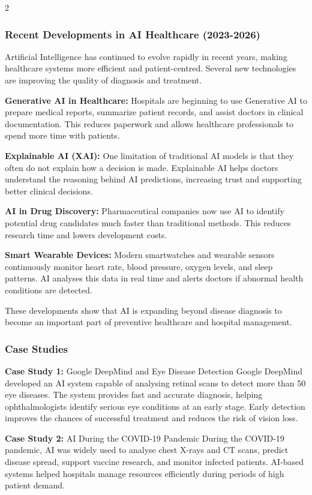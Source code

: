 \begin{multicols}{2}
\subsubsection*{Recent Developments in AI Healthcare (2023-2026)}
Artificial Intelligence has continued to evolve rapidly in recent years, making healthcare systems more efficient and patient-centred. Several new technologies are improving the quality of diagnosis and treatment.

\noindent
\textbf{Generative AI in Healthcare:} Hospitals are beginning to use Generative AI to prepare medical reports, summarize patient records, and assist doctors in clinical documentation. This reduces paperwork and allows healthcare professionals to spend more time with patients.

\noindent
\textbf{Explainable AI (XAI):} One limitation of traditional AI models is that they often do not explain how a decision is made. Explainable AI helps doctors understand the reasoning behind AI predictions, increasing trust and supporting better clinical decisions.

\noindent
\textbf{AI in Drug Discovery:} Pharmaceutical companies now use AI to identify potential drug candidates much faster than traditional methods. This reduces research time and lowers development costs.

\noindent
\textbf{Smart Wearable Devices:}
Modern smartwatches and wearable sensors continuously monitor heart rate, blood pressure, oxygen levels, and sleep patterns. AI analyses this data in real time and alerts doctors if abnormal health conditions are detected.

\noindent
These developments show that AI is expanding beyond disease diagnosis to become an important part of preventive healthcare and hospital management.

\subsubsection*{Case Studies}
\textbf{Case Study 1:} Google DeepMind and Eye Disease Detection
Google DeepMind developed an AI system capable of analysing retinal scans to detect more than 50 eye diseases. The system provides fast and accurate diagnosis, helping ophthalmologists identify serious eye conditions at an early stage. Early detection improves the chances of successful treatment and reduces the risk of vision loss.

\noindent
\textbf{Case Study 2:} AI During the COVID-19 Pandemic
During the COVID-19 pandemic, AI was widely used to analyse chest X-rays and CT scans, predict disease spread, support vaccine research, and monitor infected patients. AI-based systems helped hospitals manage resources efficiently during periods of high patient demand.


\end{multicols}
